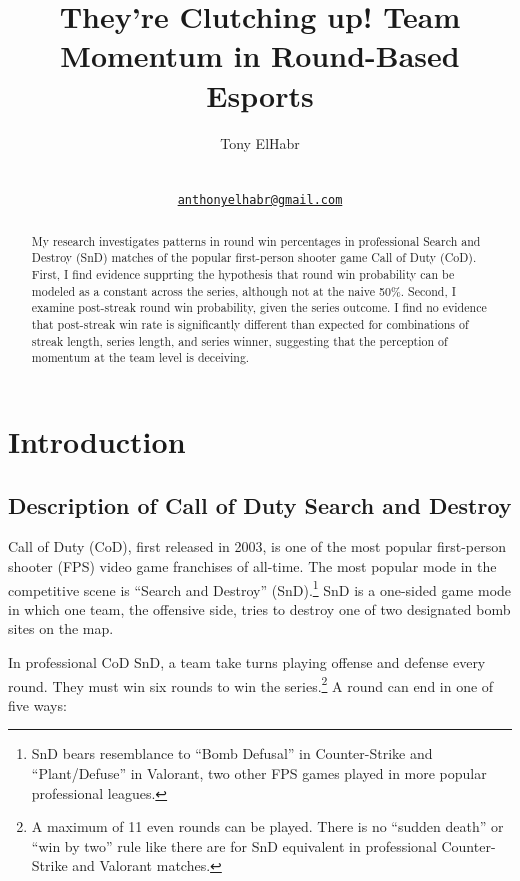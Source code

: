 \documentclass{article}
\title{They're Clutching up! Team Momentum in Round-Based Esports}
\author{
    Tony ElHabr
   \\
     \\
   \\
  \texttt{\href{mailto:anthonyelhabr@gmail.com}{\nolinkurl{anthonyelhabr@gmail.com}}} \\
  }
\begin{document}
\maketitle


\begin{abstract}
My research investigates patterns in round win percentages in
professional Search and Destroy (SnD) matches of the popular
first-person shooter game Call of Duty (CoD). First, I find evidence
supprting the hypothesis that round win probability can be modeled as a
constant across the series, although not at the naive 50\%. Second, I
examine post-streak round win probability, given the series outcome. I
find no evidence that post-streak win rate is significantly different
than expected for combinations of streak length, series length, and
series winner, suggesting that the perception of momentum at the team
level is deceiving.
\end{abstract}


\hypertarget{introduction}{%
\section{Introduction}\label{introduction}}

\hypertarget{description-of-call-of-duty-search-and-destroy}{%
\subsection{Description of Call of Duty Search and
Destroy}\label{description-of-call-of-duty-search-and-destroy}}

Call of Duty (CoD), first released in 2003, is one of the most popular
first-person shooter (FPS) video game franchises of all-time. The most
popular mode in the competitive scene is ``Search and Destroy''
(SnD).\footnote{SnD bears resemblance to ``Bomb Defusal'' in
  Counter-Strike and ``Plant/Defuse'' in Valorant, two other FPS games
  played in more popular professional leagues.} SnD is a one-sided game
mode in which one team, the offensive side, tries to destroy one of two
designated bomb sites on the map.

In professional CoD SnD, a team take turns playing offense and defense
every round. They must win six rounds to win the series.\footnote{A
  maximum of 11 even rounds can be played. There is no ``sudden death''
  or ``win by two'' rule like there are for SnD equivalent in
  professional Counter-Strike and Valorant matches.} A round can end in
one of five ways:
\end{document}
